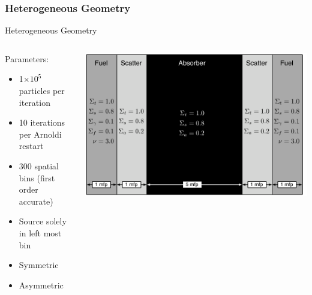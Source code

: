 \documentclass[xcolor={usenames, dvipsnames},]{beamer}
\newcommand{\e}[1]{\ensuremath{\times 10^{#1}}}
\begin{document}
\subsubsection{Heterogeneous Geometry}
\begin{frame}{Heterogeneous Geometry}
\begin{columns}
    \begin{column}{0.3\textwidth}
    Parameters:
    \begin{itemize}
        \item 1\e{5} particles per iteration
        \item 10 iterations per Arnoldi restart
        \item 300 spatial bins (first order accurate)
        \item Source solely in left most bin
        \item Symmetric
        \item Asymmetric
    \end{itemize}
    \end{column}
   
    \begin{column}{0.7\textwidth}
        \includegraphics[width=\textwidth, keepaspectratio]{Figures/MultimediaCartoon}
    \end{column}
\end{columns}
\end{frame}
\end{document}

